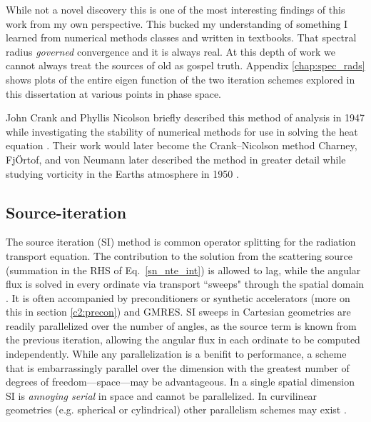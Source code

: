 While not a novel discovery this is one of the most interesting findings of this work from my own perspective.
This bucked my understanding of something I learned from numerical methods classes and written in textbooks.
That spectral radius \emph{governed} convergence and it is always real.
At this depth of work we cannot always treat the sources of old as gospel truth.
Appendix \ref{chap:spec_rads} shows plots of the entire eigen function of the two iteration schemes explored in this dissertation at various points in phase space.

John Crank and Phyllis Nicolson briefly described this method of analysis in 1947 while investigating the stability of numerical methods for use in solving the heat equation \cite{nicolson_phd}.
Their work would later become the Crank--Nicolson method \cite{Crank_Nicolson_1947}
Charney, FjÖrtof, and von Neumann later described the method in greater detail while studying vorticity in the Earths atmosphere in 1950 \cite{charney_1950_stabilityAnylisys}.


\subsection{Source-iteration}
\label{c2:source_iterations}

The source iteration (SI) method is common operator splitting for the radiation transport equation.
The contribution to the solution from the scattering source (summation in the RHS of Eq.~\eqref{sn_nte_int}) is allowed to lag, while the angular flux is solved in every ordinate via transport ``sweeps" through the spatial domain \cite{lewis_computational_1984}.
It is often accompanied by preconditioners or synthetic accelerators (more on this in section \ref{c2:precon}) and GMRES.
SI sweeps in Cartesian geometries are readily parallelized over the number of angles, as the source term is known from the previous iteration, allowing the angular flux in each ordinate to be computed independently.
While any parallelization is a benifit to performance, a scheme that is embarrassingly parallel over the dimension with the greatest number of degrees of freedom---space---may be advantageous.
In a single spatial dimension SI is \textit{annoying serial} in space and cannot be parallelized.
In curvilinear geometries (e.g. spherical or cylindrical) other parallelism schemes may exist \cite{palmer_phd}.

